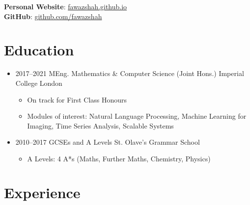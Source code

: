 \documentclass[11pt,a4paper,sans]{moderncv}        %
\begin{document}
\maketitle

\vspace{-40pt}

\begin{center}
\textbf{Personal Website}: \href{https://fawazshah.github.io/}{fawazshah.github.io} \\
\textbf{GitHub}: \href{https://github.com/fawazshah/}{github.com/fawazshah}
\end{center}

\section{Education}

\begin{itemize}

\item{
\cventry
{2017--2021}
{MEng. Mathematics \& Computer Science (Joint Hons.)}
{Imperial College London}
{}{}{
\begin{itemize}
\item On track for First Class Honours
\item Modules of interest: Natural Language Processing, Machine Learning for Imaging, Time Series Analysis, Scalable Systems
\end{itemize}
}} %

\item{
\cventry
{2010--2017}
{GCSEs and A Levels}
{St. Olave's Grammar School}
{}{}{
\begin{itemize}
\item A Levels: 4 A*s (Maths, Further Maths, Chemistry, Physics)
\end{itemize}
}}

\end{itemize}

\vspace{-10pt}

\section{Experience}
\end{document}
